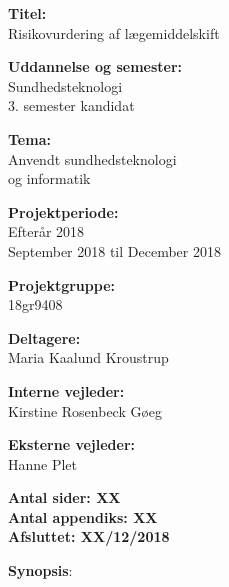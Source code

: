 \begin{minipage}[t]{0.48\textwidth}
\textbf{Titel:} \\[5pt]\bigskip\hspace{2ex}
Risikovurdering af lægemiddelskift

\textbf{Uddannelse og semester:} \\[5pt]\bigskip\hspace{2ex}
Sundhedsteknologi \\ \bigskip\hspace{2ex} 3. semester kandidat

\textbf{Tema:} \\[5pt]\bigskip\hspace{2ex}
Anvendt sundhedsteknologi \\ \bigskip\hspace{2ex}
og informatik

\vspace*{2mm}

\textbf{Projektperiode:} \\[5pt]\bigskip\hspace{2ex}
Efterår 2018  \\ \bigskip\hspace{2ex} September 2018 til December 2018

\textbf{Projektgruppe:} \\[5pt]\bigskip\hspace{2ex}
18gr9408

\textbf{Deltagere:} \\[5pt]\hspace*{2ex}
Maria Kaalund Kroustrup

\vspace*{5mm}

\textbf{Interne vejleder:} \\[5pt]\hspace*{2ex}
Kirstine Rosenbeck Gøeg 

\vspace*{2mm}

\textbf{Eksterne vejleder:} \\[5pt]\hspace*{2ex}
Hanne Plet\\\bigskip\hspace{2ex}


\textbf{Antal sider: XX} \\
\textbf{Antal appendiks: XX} \\ 
\textbf{Afsluttet: XX/12/2018}

\end{minipage}
\hfill
\begin{minipage}[t]{0.483\textwidth}
\textbf{Synopsis}: \\[5pt]
\fbox{\parbox{7cm}{\bigskip\bigskip}}
\end{minipage}

